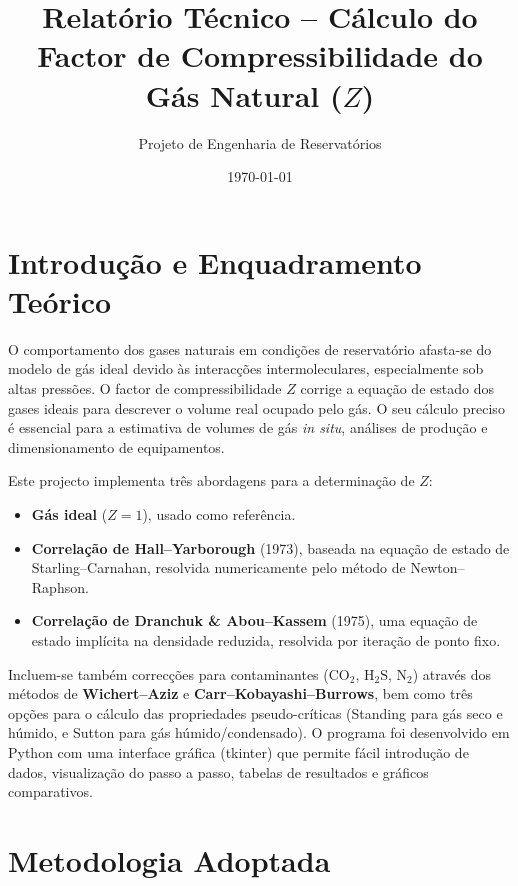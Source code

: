 \documentclass[a4paper,12pt]{article}
\title{\textbf{Relatório Técnico – Cálculo do Factor de Compressibilidade do Gás Natural ($Z$)}}
\author{Projeto de Engenharia de Reservatórios}
\date{\today}
\begin{document}
\sloppy
\maketitle
\thispagestyle{empty}
\newpage

\tableofcontents
\newpage

\section{Introdução e Enquadramento Teórico}
O comportamento dos gases naturais em condições de reservatório afasta-se do modelo de gás ideal devido às interacções intermoleculares, especialmente sob altas pressões. O factor de compressibilidade \(Z\) corrige a equação de estado dos gases ideais para descrever o volume real ocupado pelo gás. O seu cálculo preciso é essencial para a estimativa de volumes de gás \emph{in situ}, análises de produção e dimensionamento de equipamentos.

Este projecto implementa três abordagens para a determinação de \(Z\):
\begin{itemize}
    \item \textbf{Gás ideal} (\(Z = 1\)), usado como referência.
    \item \textbf{Correlação de Hall–Yarborough} (1973), baseada na equação de estado de Starling–Carnahan, resolvida numericamente pelo método de Newton–Raphson.
    \item \textbf{Correlação de Dranchuk \& Abou–Kassem} (1975), uma equação de estado implícita na densidade reduzida, resolvida por iteração de ponto fixo.
\end{itemize}

Incluem-se também correcções para contaminantes (\(\mathrm{CO}_2\), \(\mathrm{H}_2\mathrm{S}\), \(\mathrm{N}_2\)) através dos métodos de \textbf{Wichert–Aziz} e \textbf{Carr–Kobayashi–Burrows}, bem como três opções para o cálculo das propriedades pseudo-críticas (Standing para gás seco e húmido, e Sutton para gás húmido/condensado). O programa foi desenvolvido em Python com uma interface gráfica (tkinter) que permite fácil introdução de dados, visualização do passo a passo, tabelas de resultados e gráficos comparativos.

\section{Metodologia Adoptada}
\end{document}
